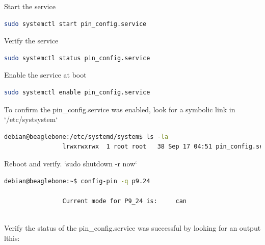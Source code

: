             Start the service
    
            \begin{lstlisting}[language=bash, autogobble=true]
                sudo systemctl start pin_config.service
            \end{lstlisting}
            Verify the service
    
            \begin{lstlisting}[language=bash, autogobble=true]
                sudo systemctl status pin_config.service
            \end{lstlisting}
            Enable the service at boot
    
            \begin{lstlisting}[language=bash, autogobble=true]
                sudo systemctl enable pin_config.service
            \end{lstlisting}
            To confirm the pin\_config.service was enabled, look for a symbolic link in `/etc/systsystem`
    
            \begin{lstlisting}[language=bash, autogobble=true]
                debian@beaglebone:/etc/systemd/system$ ls -la
                lrwxrwxrwx  1 root root   38 Sep 17 04:51 pin_config.service -> /lib/systemd/system/    pin_config.service
            \end{lstlisting}
    
            Reboot and verify. `sudo shutdown -r now`
    
            \begin{lstlisting}[language=bash, autogobble=true]
                debian@beaglebone:~$ config-pin -q p9.24
    
                Current mode for P9_24 is:     can
    
            \end{lstlisting}
    
            Verify the status of the pin\_config.service was successful by looking for an output lthis:
    
